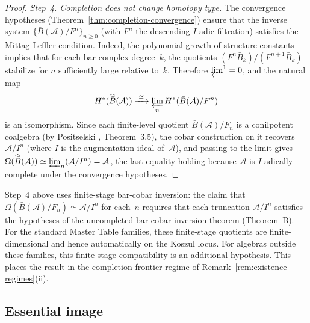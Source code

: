 \begin{proof}
\emph{Step~4. Completion does not change homotopy type.}
The convergence hypotheses (Theorem~\ref{thm:completion-convergence}) ensure that the inverse system $\{\bar{B}(\mathcal{A})/F^n\}_{n \geq 0}$ (with $F^n$ the descending $I$-adic filtration) satisfies the Mittag-Leffler condition.  Indeed, the polynomial growth of structure constants implies that for each bar complex degree~$k$, the quotients $(F^n \bar{B}_k)/(F^{n+1} \bar{B}_k)$ stabilize for $n$ sufficiently large relative to~$k$.  Therefore $\varprojlim^1 = 0$, and the natural map
\[
H^*(\widehat{\bar{B}}(\mathcal{A})) \xrightarrow{\;\cong\;} \varprojlim_n H^*(\bar{B}(\mathcal{A})/F^n)
\]
is an isomorphism.  Since each finite-level quotient $\bar{B}(\mathcal{A})/F_n$ is a conilpotent coalgebra (by Positselski \cite{Positselski11}, Theorem~3.5), the cobar construction on it recovers~$\mathcal{A}/I^n$ (where $I$ is the augmentation ideal of~$\mathcal{A}$), and passing to the limit gives $\Omega(\widehat{\bar{B}}(\mathcal{A})) \simeq \varprojlim_n (\mathcal{A}/I^n) = \mathcal{A}$, the last equality holding because $\mathcal{A}$ is $I$-adically complete under the convergence hypotheses.
\end{proof}

\begin{remark}\label{rem:completed-bar-cobar-frontier}
Step~4 above uses finite-stage bar-cobar inversion: the claim that
$\Omega(\bar{B}(\mathcal{A})/F_n) \simeq \mathcal{A}/I^n$ for each~$n$
requires that each truncation $\mathcal{A}/I^n$ satisfies the hypotheses
of the uncompleted bar-cobar inversion theorem (Theorem~B).  For the
standard Master Table families, these finite-stage quotients are
finite-dimensional and hence automatically on the Koszul locus.  For
algebras outside these families, this finite-stage compatibility is an
additional hypothesis.  This places the result in the completion
frontier regime of Remark~\ref{rem:existence-regimes}(ii).
\end{remark}

\subsection{Essential image}

